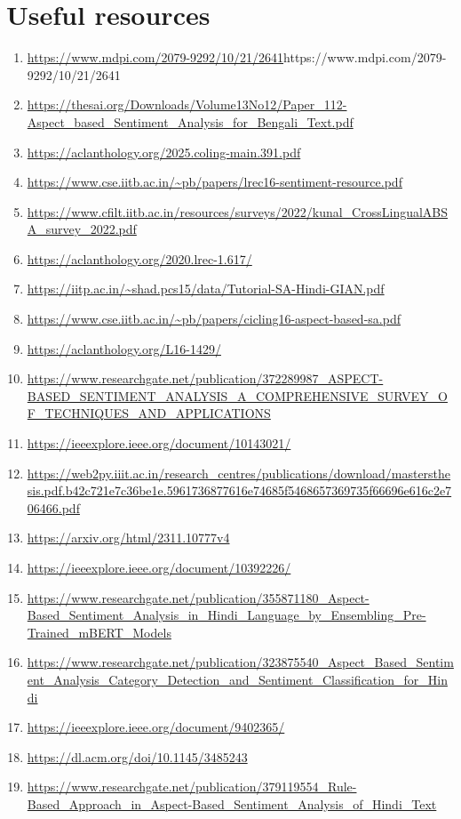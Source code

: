 \documentclass{article}
\begin{document}
\section{Useful resources}
\begin{enumerate}
\item \url{https://www.mdpi.com/2079-9292/10/21/2641}{https://www.mdpi.com/2079-9292/10/21/2641}
\item \url {https://thesai.org/Downloads/Volume13No12/Paper_112-Aspect_based_Sentiment_Analysis_for_Bengali_Text.pdf}
\item \url{https://aclanthology.org/2025.coling-main.391.pdf}
\item \url{https://www.cse.iitb.ac.in/~pb/papers/lrec16-sentiment-resource.pdf}
\item \url{https://www.cfilt.iitb.ac.in/resources/surveys/2022/kunal_CrossLingualABSA_survey_2022.pdf}
\item \url{https://aclanthology.org/2020.lrec-1.617/}
\item \url{https://iitp.ac.in/~shad.pcs15/data/Tutorial-SA-Hindi-GIAN.pdf}
\item \url{https://www.cse.iitb.ac.in/~pb/papers/cicling16-aspect-based-sa.pdf}
\item \url{https://aclanthology.org/L16-1429/}
\item \url{https://www.researchgate.net/publication/372289987_ASPECT-BASED_SENTIMENT_ANALYSIS_A_COMPREHENSIVE_SURVEY_OF_TECHNIQUES_AND_APPLICATIONS}
\item \url{https://ieeexplore.ieee.org/document/10143021/}
\item \url{https://web2py.iiit.ac.in/research_centres/publications/download/mastersthesis.pdf.b42c721e7c36be1e.5961736877616e74685f5468657369735f66696e616c2e706466.pdf}
\item \url{https://arxiv.org/html/2311.10777v4}
\item \url{https://ieeexplore.ieee.org/document/10392226/}
\item \url{https://www.researchgate.net/publication/355871180_Aspect-Based_Sentiment_Analysis_in_Hindi_Language_by_Ensembling_Pre-Trained_mBERT_Models}
\item \url{https://www.researchgate.net/publication/323875540_Aspect_Based_Sentiment_Analysis_Category_Detection_and_Sentiment_Classification_for_Hindi}
\item \url{https://ieeexplore.ieee.org/document/9402365/}
\item \url{https://dl.acm.org/doi/10.1145/3485243}
\item \url{https://www.researchgate.net/publication/379119554_Rule-Based_Approach_in_Aspect-Based_Sentiment_Analysis_of_Hindi_Text}

\end{enumerate}
\end{document}
